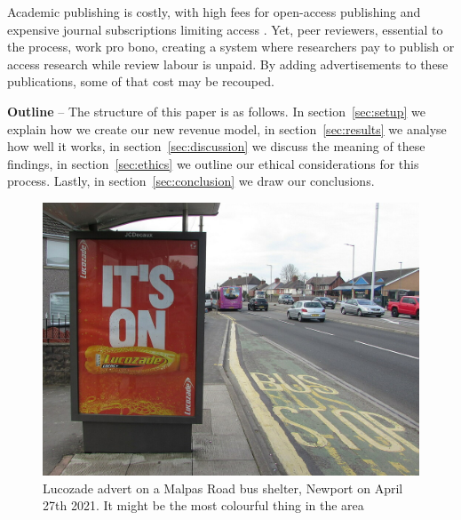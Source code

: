 \documentclass[letterpaper, twocolumn]{article}
\begin{document}
	Academic publishing is costly, with high fees for open-access publishing and expensive journal subscriptions limiting access \cite{Solomon_2012}. Yet, peer reviewers, essential to the process, work pro bono, creating a system where researchers pay to publish or access research while review labour is unpaid. By adding advertisements to these publications, some of that cost may be recouped.
	
	\textbf{Outline} -- The structure of this paper is as follows. In section~\ref{sec:setup} we explain how we create our new revenue model, in section~\ref{sec:results} we analyse how well it works, in section~\ref{sec:discussion} we discuss the meaning of these findings, in section~\ref{sec:ethics} we outline our ethical considerations for this process. Lastly, in section~\ref{sec:conclusion} we draw our conclusions.
	
	
	\begin{figure}[]
		\begin{center}
			\includegraphics[width=1\linewidth]{figs/bus-stop.jpg}
			\caption{Lucozade advert on a Malpas Road bus shelter, Newport on April 27th 2021. It might be the most colourful thing in the area}
			\label{fig:bus-stop}
		\end{center}
	\end{figure}
	
\end{document}
